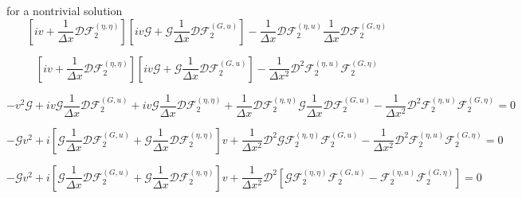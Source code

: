\documentclass[12pt]{article}
\begin{document}
for a nontrivial solution
\[\left[iv + \frac{1}{\Delta x} \mathcal{D}\mathcal{F}_2^{(\eta,\eta)}\right]\left[iv\mathcal{G} + \mathcal{G} \frac{1}{\Delta x} \mathcal{D}\mathcal{F}_2^{(G,u)} \right] - \frac{1}{\Delta x} \mathcal{D}\mathcal{F}_2^{(\eta,u)}\frac{1}{\Delta x} \mathcal{D}\mathcal{F}_2^{(G,\eta)}\]

\[\left[iv + \frac{1}{\Delta x} \mathcal{D}\mathcal{F}_2^{(\eta,\eta)}\right]\left[iv\mathcal{G} + \mathcal{G} \frac{1}{\Delta x} \mathcal{D}\mathcal{F}_2^{(G,u)} \right] - \frac{1}{\Delta x^2} \mathcal{D}^2\mathcal{F}_2^{(\eta,u)} \mathcal{F}_2^{(G,\eta)}\]

\[ -v^2\mathcal{G} + iv\mathcal{G} \frac{1}{\Delta x} \mathcal{D}\mathcal{F}_2^{(G,u)} + iv\mathcal{G}\frac{1}{\Delta x} \mathcal{D}\mathcal{F}_2^{(\eta,\eta)} + \frac{1}{\Delta x} \mathcal{D}\mathcal{F}_2^{(\eta,\eta)}\mathcal{G} \frac{1}{\Delta x} \mathcal{D}\mathcal{F}_2^{(G,u)}  - \frac{1}{\Delta x^2} \mathcal{D}^2\mathcal{F}_2^{(\eta,u)} \mathcal{F}_2^{(G,\eta)} = 0\]

\[ -\mathcal{G}v^2 + i \left[\mathcal{G} \frac{1}{\Delta x} \mathcal{D}\mathcal{F}_2^{(G,u)} + \mathcal{G}\frac{1}{\Delta x} \mathcal{D}\mathcal{F}_2^{(\eta,\eta)}\right]v + \frac{1}{\Delta x^2} \mathcal{D}^2\mathcal{G}\mathcal{F}_2^{(\eta,\eta)} \mathcal{F}_2^{(G,u)}  - \frac{1}{\Delta x^2} \mathcal{D}^2\mathcal{F}_2^{(\eta,u)} \mathcal{F}_2^{(G,\eta)} = 0\]

\[ -\mathcal{G}v^2 + i \left[\mathcal{G} \frac{1}{\Delta x} \mathcal{D}\mathcal{F}_2^{(G,u)} + \mathcal{G}\frac{1}{\Delta x} \mathcal{D}\mathcal{F}_2^{(\eta,\eta)}\right]v + \frac{1}{\Delta x^2} \mathcal{D}^2\left[\mathcal{G}\mathcal{F}_2^{(\eta,\eta)} \mathcal{F}_2^{(G,u)}  - \mathcal{F}_2^{(\eta,u)} \mathcal{F}_2^{(G,\eta)}\right] = 0\]
\end{document}
